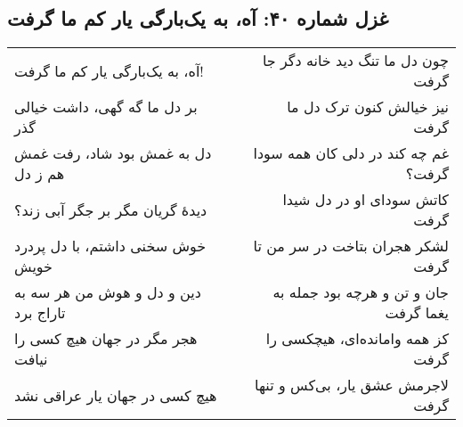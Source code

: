 \begin{center}
\section*{غزل شماره ۴۰: آه، به یک‌بارگی یار کم ما گرفت}
\label{sec:040}
\begin{longtable}{l p{0.5cm} r}
آه، به یک‌بارگی یار کم ما گرفت!
&&
چون دل ما تنگ دید خانه دگر جا گرفت
\\
بر دل ما گه گهی، داشت خیالی گذر
&&
نیز خیالش کنون ترک دل ما گرفت
\\
دل به غمش بود شاد، رفت غمش هم ز دل
&&
غم چه کند در دلی کان همه سودا گرفت؟
\\
دیدهٔ گریان مگر بر جگر آبی زند؟
&&
کاتش سودای او در دل شیدا گرفت
\\
خوش سخنی داشتم، با دل پردرد خویش
&&
لشکر هجران بتاخت در سر من تا گرفت
\\
دین و دل و هوش من هر سه به تاراج برد
&&
جان و تن و هرچه بود جمله به یغما گرفت
\\
هجر مگر در جهان هیچ کسی را نیافت
&&
کز همه وامانده‌ای، هیچکسی را گرفت
\\
هیچ کسی در جهان یار عراقی نشد
&&
لاجرمش عشق یار، بی‌کس و تنها گرفت
\\
\end{longtable}
\end{center}
